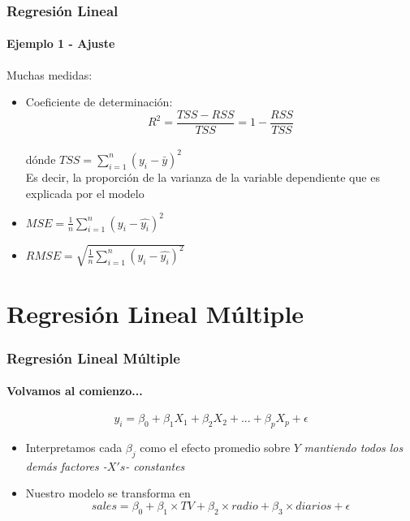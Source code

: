 \documentclass{beamer}
\begin{document}
\begin{frame}
\frametitle{Regresión Lineal}
\framesubtitle{Ejemplo 1 - Ajuste}

Muchas medidas:
\linebreak
	\begin{itemize}
		\item Coeficiente de determinación:
			\begin{equation}
				R^2 = \frac{TSS-RSS}{TSS} = 1-\frac{RSS}{TSS}
			\end{equation} \\
			dónde $TSS=\sum_{i=1}^n(y_{i}-\bar{y})^2$ \\

			Es decir, la proporción de la varianza de la variable dependiente que es explicada por el modelo
		\item{$MSE=\frac{1}{n}\sum_{i=1}^n(y_{i}-\hat{y_{i}})^2$}
		\item{$RMSE=\sqrt{\frac{1}{n}\sum_{i=1}^n(y_{i}-\hat{y_{i}})^2}$}
		
	\end{itemize}
\end{frame}

\section{Regresión Lineal Múltiple}
\begin{frame}
\frametitle{Regresión Lineal Múltiple}
\framesubtitle{Volvamos al comienzo...}

	\begin{equation}
		y_{i} = \beta_{0} + \beta_{1}X_{1} + \beta_{2}X_{2} +...+ \beta_{p}X_{p} + \epsilon
	\end{equation}

\begin{itemize}
	\item Interpretamos cada $\beta_{j}$ como el efecto promedio sobre $Y$ \textit{mantiendo todos los demás factores -$X's$- constantes}
	\item Nuestro modelo se transforma en
		 \begin{equation}
		 sales  =  \beta_{0} + \beta_{1} \times TV + \beta_{2} \times radio + \beta_{3} \times diarios + \epsilon	 	
\end{equation}
	\end{itemize}
\end{frame}
\end{document}
